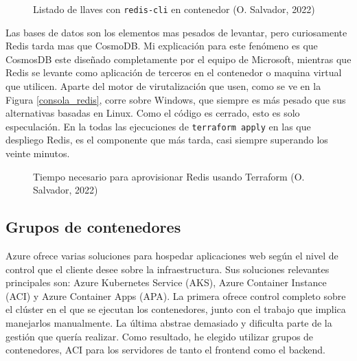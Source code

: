 \documentclass[11pt]{article}
\begin{document}
\begin{flushleft}
		\begin{figure}[htb]
			\centering
			\caption{Listado de llaves con \texttt{redis-cli} en contenedor (O. Salvador, 2022)}
		\end{figure}
	
	Las bases de datos son los elementos mas pesados de levantar, pero curiosamente Redis tarda mas que CosmoDB. Mi explicación para este fenómeno es que CosmosDB este diseñado completamente por el equipo de Microsoft, mientras que Redis se levante como aplicación de terceros en el contenedor o maquina virtual que utilicen. Aparte del motor de virutalización que usen, como se ve en la Figura \ref{consola_redis}, corre sobre Windows, que siempre es más pesado que sus alternativas basadas en Linux. Como el código es cerrado, esto es solo especulación. En la todas las ejecuciones de \texttt{terraform apply} en las que despliego Redis, es el componente que más tarda, casi siempre superando los veinte minutos.
	\linebreak
	
	\begin{figure}[htb]
		\centering
		\caption{Tiempo necesario para aprovisionar Redis usando Terraform (O. Salvador, 2022)}
	\end{figure}

	
	\bigskip
	\bigskip
	
	\subsection{Grupos de contenedores}
	Azure ofrece varias soluciones para hospedar aplicaciones web según el nivel de control que el cliente desee sobre la infraestructura. Sus soluciones relevantes principales son: Azure Kubernetes Service (AKS), Azure Container Instance (ACI) y Azure Container Apps (APA). La primera ofrece control completo sobre el clúster en el que se ejecutan los contenedores, junto con el trabajo que implica manejarlos manualmente. La última abstrae demasiado y dificulta parte de la gestión que quería realizar. Como resultado, he elegido utilizar grupos de contenedores, ACI para los servidores de tanto el frontend como el backend.
	\linebreak
	

\end{flushleft}
\end{document}
